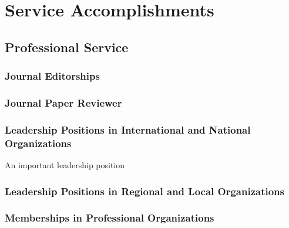 \section{Service Accomplishments}
\subsection{Professional Service}
\subsubsection{Journal Editorships}

\subsubsection{Journal Paper Reviewer}



\subsubsection{Leadership Positions in International and National Organizations}
\begin{myenum}
  \item An important leadership position
\end{myenum}

\subsubsection{Leadership Positions in Regional and Local Organizations}

\subsubsection{Memberships in Professional Organizations}

